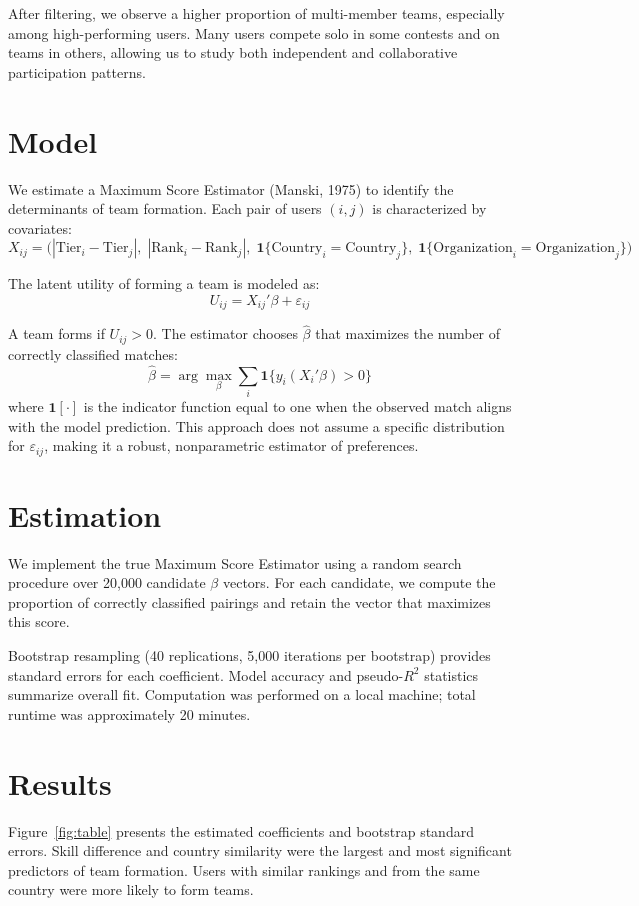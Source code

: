 \documentclass[12pt]{article}
\begin{document}
After filtering, we observe a higher proportion of multi-member teams, especially among high-performing users. Many users compete solo in some contests and on teams in others, allowing us to study both independent and collaborative participation patterns.

\section{Model}
We estimate a Maximum Score Estimator (Manski, 1975) to identify the determinants of team formation. Each pair of users $(i,j)$ is characterized by covariates:
\[
X_{ij} = \Big( | \text{Tier}_i - \text{Tier}_j |,\; | \text{Rank}_i - \text{Rank}_j |,\;
\mathbf{1}\{\text{Country}_i = \text{Country}_j\},\;
\mathbf{1}\{\text{Organization}_i = \text{Organization}_j\} \Big)
\]

The latent utility of forming a team is modeled as:
\[
U_{ij} = X_{ij}'\beta + \varepsilon_{ij}
\]

A team forms if $U_{ij} > 0$. The estimator chooses $\hat{\beta}$ that maximizes the number of correctly classified matches:
\[
\hat{\beta} = \arg\max_{\beta} \sum_i \mathbf{1}\{y_i(X_i'\beta) > 0\}
\]
where $\mathbf{1}[\cdot]$ is the indicator function equal to one when the observed match aligns with the model prediction. This approach does not assume a specific distribution for $\varepsilon_{ij}$, making it a robust, nonparametric estimator of preferences.

\section{Estimation}
We implement the true Maximum Score Estimator using a random search procedure over 20,000 candidate $\beta$ vectors. For each candidate, we compute the proportion of correctly classified pairings and retain the vector that maximizes this score. 

Bootstrap resampling (40 replications, 5,000 iterations per bootstrap) provides standard errors for each coefficient. Model accuracy and pseudo-$R^2$ statistics summarize overall fit. Computation was performed on a local machine; total runtime was approximately 20 minutes.

\section{Results}
Figure~\ref{fig:table} presents the estimated coefficients and bootstrap standard errors. Skill difference and country similarity were the largest and most significant predictors of team formation. Users with similar rankings and from the same country were more likely to form teams. 
\end{document}
